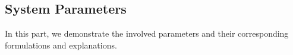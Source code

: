 \documentclass[fleqn]{singlecol-new}
\begin{document}



\subsection{System Parameters}
In this part, we demonstrate the involved parameters and their
corresponding formulations and explanations.
\end{document}
